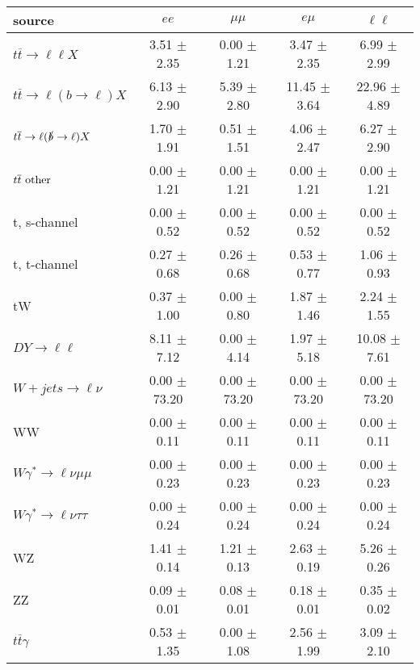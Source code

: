\begin{tabular}{l|cccc} \hline\hline
source & $ee$ & $\mu\mu$ & $e\mu$ & $\ell\ell $ \\
\hline
$t\overline{t} \rightarrow \ell \ell X$ &  3.51 $\pm$  2.35 &  0.00 $\pm$  1.21 &  3.47 $\pm$  2.35 &  6.99 $\pm$  2.99 \\
$t\overline{t} \rightarrow \ell (b \rightarrow \ell) X$ &  6.13 $\pm$  2.90 &  5.39 $\pm$  2.80 & 11.45 $\pm$  3.64 & 22.96 $\pm$  4.89 \\
$t\overline{t} \rightarrow \ell (\slashed b \rightarrow \ell) X$ &  1.70 $\pm$  1.91 &  0.51 $\pm$  1.51 &  4.06 $\pm$  2.47 &  6.27 $\pm$  2.90 \\
        $t\overline{t}\ \rm{other}$ &  0.00 $\pm$  1.21 &  0.00 $\pm$  1.21 &  0.00 $\pm$  1.21 &  0.00 $\pm$  1.21 \\
\hline
                       t, s-channel &  0.00 $\pm$  0.52 &  0.00 $\pm$  0.52 &  0.00 $\pm$  0.52 &  0.00 $\pm$  0.52 \\
                       t, t-channel &  0.27 $\pm$  0.68 &  0.26 $\pm$  0.68 &  0.53 $\pm$  0.77 &  1.06 $\pm$  0.93 \\
                                 tW &  0.37 $\pm$  1.00 &  0.00 $\pm$  0.80 &  1.87 $\pm$  1.46 &  2.24 $\pm$  1.55 \\
\hline
         $DY \rightarrow \ell \ell$ &  8.11 $\pm$  7.12 &  0.00 $\pm$  4.14 &  1.97 $\pm$  5.18 & 10.08 $\pm$  7.61 \\
      $W+jets \rightarrow \ell \nu$ &  0.00 $\pm$ 73.20 &  0.00 $\pm$ 73.20 &  0.00 $\pm$ 73.20 &  0.00 $\pm$ 73.20 \\
                                 WW &  0.00 $\pm$  0.11 &  0.00 $\pm$  0.11 &  0.00 $\pm$  0.11 &  0.00 $\pm$  0.11 \\
\hline
$W\gamma^{*} \rightarrow \ell \nu \mu\mu$ &  0.00 $\pm$  0.23 &  0.00 $\pm$  0.23 &  0.00 $\pm$  0.23 &  0.00 $\pm$  0.23 \\
$W\gamma^{*} \rightarrow \ell \nu \tau\tau$ &  0.00 $\pm$  0.24 &  0.00 $\pm$  0.24 &  0.00 $\pm$  0.24 &  0.00 $\pm$  0.24 \\
                                 WZ &  1.41 $\pm$  0.14 &  1.21 $\pm$  0.13 &  2.63 $\pm$  0.19 &  5.26 $\pm$  0.26 \\
                                 ZZ &  0.09 $\pm$  0.01 &  0.08 $\pm$  0.01 &  0.18 $\pm$  0.01 &  0.35 $\pm$  0.02 \\
\hline
              $t\overline{t}\gamma$ &  0.53 $\pm$  1.35 &  0.00 $\pm$  1.08 &  2.56 $\pm$  1.99 &  3.09 $\pm$  2.10 \\

\end{tabular}
